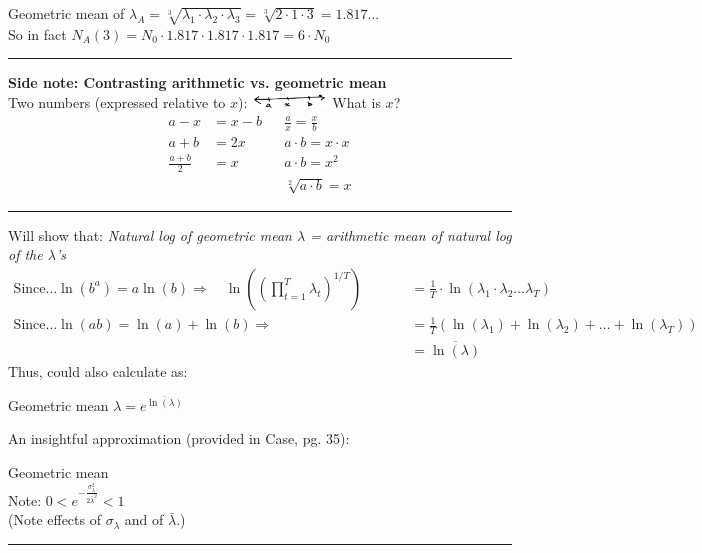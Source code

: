 \documentclass{article}
\newcommand{\enlargeMath}[1]{\scalebox{1.2}{#1}}
\begin{document}
\begin{center}
	Geometric mean of $\lambda_A = \sqrt[3]{\lambda_1 \cdot \lambda_2 \cdot \lambda_3} = \sqrt[3]{2 \cdot 1 \cdot 3} = 1.817...$\\
	So in fact $N_A(3) = N_0 \cdot 1.817 \cdot 1.817 \cdot 1.817 = 6 \cdot N_0$
\end{center}

\begin{center}\rule[0.1ex]{0.6\linewidth}{1pt}\end{center}
\textbf{Side note: Contrasting arithmetic vs. geometric mean}\\
Two numbers (expressed relative to $x$):
\includegraphics[width=2cm]{figs/ab_line}  What is $x$?
\begin{align*}
	a-x & = x-b & & \frac{a}{x} = \frac{x}{b}\\
	a+b&=2x & & a \cdot b = x \cdot x\\
	\frac{a+b}{2}&=x & & a \cdot b = x^2\\
	&&& \sqrt[2]{a \cdot b} = x
\end{align*}
\begin{center}\rule[0.1ex]{0.6\linewidth}{1pt}\end{center}

Will show that: 	\emph{Natural log of geometric mean $\lambda$ = arithmetic mean of natural log of the $\lambda$'s}
\begin{align*}
	\text{Since...} \ln(b^a) = a\ln(b)  \Rightarrow \quad
	\ln \left( \left(\prod_{t=1}^T \lambda_t \right)^{1/T}\right) &= \frac{1}{T} \cdot \ln(\lambda_1 \cdot \lambda_2 \dots \lambda_T ) \\
	\text{Since...} \ln(ab) = \ln(a)+\ln(b)  \Rightarrow \quad \quad \quad \quad \quad \quad \quad \quad \quad
	&= \frac{1}{T} \left( \ln(\lambda_1) + \ln(\lambda_2) + \dots+ \ln(\lambda_T) \right) \\	
	&=\overline{\ln(\lambda)}
\end{align*}
Thus, could also calculate as:
\begin{center}
	Geometric mean $\lambda = e^{\overline{\ln(\lambda)}}$
\end{center}
An insightful approximation (provided in Case, pg. 35):
\begin{center}
	Geometric mean \enlargeMath{$\lambda = e^{\overline{\ln(\lambda)}} \approx e^{\ln(\bar{\lambda})-\frac{\sigma_\lambda^2}{2\bar{\lambda}^2}} = \bar{\lambda} \cdot e^{-\frac{\sigma_\lambda^2}{2 \bar{\lambda}^2}}$}\\
	Note: $0 < e^{-\frac{\sigma_\lambda^2}{2 \bar{\lambda}^2}} < 1$\\
	(Note effects of $\sigma_{\lambda}$ and of $\bar{\lambda}$.)
\end{center}
\rule[0.5ex]{\linewidth}{1pt}
\end{document}

